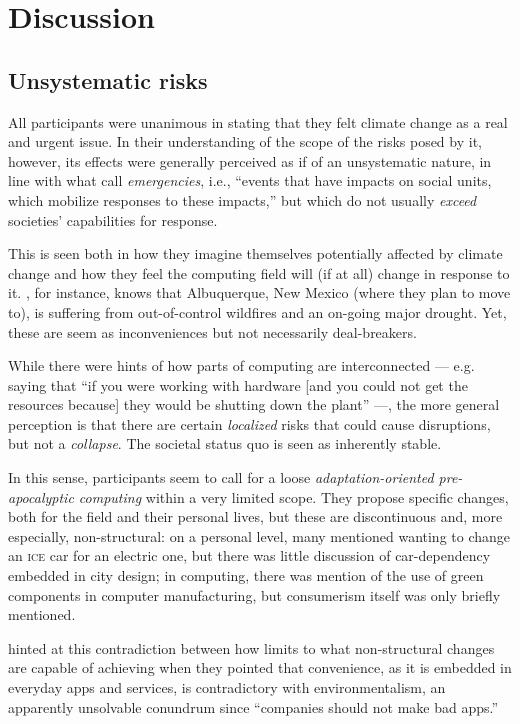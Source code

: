 \section{Discussion}

\subsection{Unsystematic risks}

All participants were unanimous in stating that they felt climate change as a real and urgent issue. In their understanding of the scope of the risks posed by it, however, its effects were generally perceived as if of an unsystematic nature, in line with what \citeauthor{silberman2010precarious} call \emph{emergencies}, i.e., ``events that have impacts on social units, which mobilize responses to these impacts,'' but which do not usually \emph{exceed} societies' capabilities for response.

This is seen both in how they imagine themselves potentially affected by climate change and how they feel the computing field will (if at all) change in response to it. , for instance, knows that Albuquerque, New Mexico (where they plan to move to), is suffering from out-of-control wildfires and an on-going major drought. Yet, these are seem as inconveniences but not necessarily deal-breakers.

While there were hints of how parts of computing are interconnected --- e.g.  saying that ``if you were working with hardware [and you could not get the resources because] they would be shutting down the plant'' ---, the more general perception is that there are certain \emph{localized} risks that could cause disruptions, but not a \emph{collapse}. The societal status quo is seen as inherently stable.

In this sense, participants seem to call for a loose \emph{adaptation-oriented pre-apocalyptic computing} within a very limited scope. They propose specific changes, both for the field and their personal lives, but these are discontinuous and, more especially, non-structural: on a personal level, many mentioned wanting to change an \textsc{ice} car for an electric one, but there was little discussion of car-dependency embedded in city design; in computing, there was mention of the use of green components in computer manufacturing, but consumerism itself was only briefly mentioned.

 hinted at this contradiction between how limits to what non-structural changes are capable of achieving when they pointed that convenience, as it is embedded in everyday apps and services, is contradictory with environmentalism, an apparently unsolvable conundrum since ``companies should not make bad apps.''

